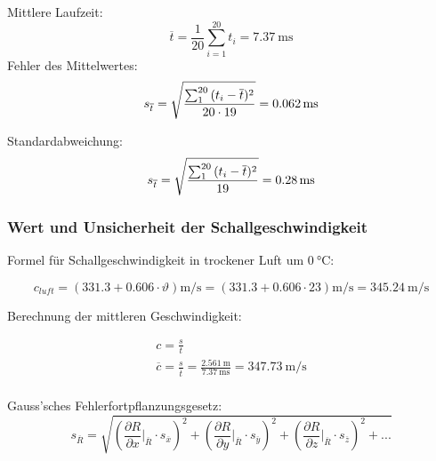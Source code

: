 Mittlere Laufzeit:
\begin{equation}
    \overline{t} = \frac{1}{20} \sum_{i=1}^{20} t_i = \SI{7.37}{\milli\second}
\end{equation}
Fehler des Mittelwertes:
\begin{equation}
    s_{\overline{t}} = \sqrt{ \frac{\sum_{1}^{20}{(t_i-\overline{t})^2}}{20 \cdot 19}} = \SI{0.062}{\milli\second} \\
\end{equation}

Standardabweichung:
\begin{equation}
    s_{\overline{t}} = \sqrt{ \frac{\sum_{1}^{20}{(t_i-\overline{t})^2}}{19}} = \SI{0.28}{\milli\second} \\
\end{equation}


\subsubsection{Wert und Unsicherheit der Schallgeschwindigkeit}

Formel f\"ur Schallgeschwindigkeit in trockener Luft um $\SI{0}{\celsius}$:

\begin{equation}
    c_{luft} = (331.3 + 0.606 \cdot \vartheta) \si{\meter\per\second} = (331.3 + 0.606 \cdot 23) \si{\meter\per\second} = \SI{345.24}{\meter\per\second}
\end{equation}

Berechnung der mittleren Geschwindigkeit:

\begin{gather}
    c = \frac{s}{t} \\
    \overline{c} = \frac{s}{\overline{t}} = \frac{\SI{2.561}{\meter}}{\SI{7.37}{\milli\second}} = \SI{347.73}{\meter\per\second} \\
\end{gather}

Gauss'sches Fehlerfortpflanzungsgesetz:
\begin{equation}
    s_{\overline{R}} = \sqrt{ \left( \frac{\partial R}{\partial x} \biggr\rvert_{\overline{R}} \cdot s_{\overline{x}}\right)^2
                            + \left( \frac{\partial R}{\partial y} \biggr\rvert_{\overline{R}} \cdot s_{\overline{y}}\right)^2
                            + \left( \frac{\partial R}{\partial z} \biggr\rvert_{\overline{R}} \cdot s_{\overline{z}}\right)^2
                            + ... }
\end{equation}

